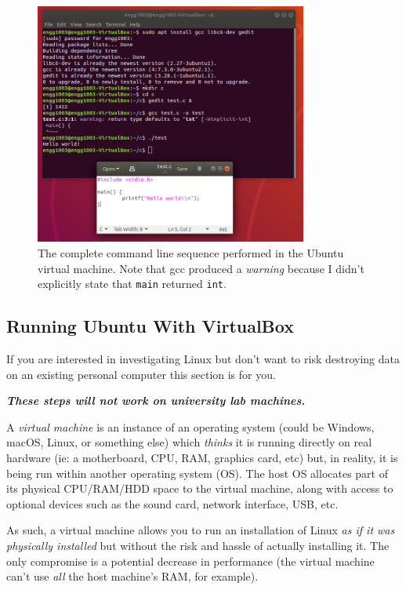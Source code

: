 \documentclass{lab}
\begin{document}
\begin{figure}[H]
\begin{center}
\includegraphics[width=0.8\textwidth]{Wk1Images/c_ubuntu.png}
\end{center}
\caption{The complete command line sequence performed in the Ubuntu virtual machine. Note that gcc produced a \textit{warning} because I didn't explicitly state that \texttt{main} returned \texttt{int}.}\label{fig:c_ubuntu}
\end{figure}

\pagebreak
\subsection{Running Ubuntu With VirtualBox}\label{sec:virtualbox}

If you are interested in investigating Linux but don't want to risk destroying data on an existing personal computer this section is for you.

\textbf{\textit{These steps will not work on university lab machines.}}

A \textit{virtual machine} is an instance of an operating system (could be Windows, macOS, Linux, or something else) which \textit{thinks} it is running directly on real hardware (ie: a motherboard, CPU, RAM, graphics card, etc) but, in reality, it is being run within another operating system (OS). The host OS allocates part of its physical CPU/RAM/HDD space to the virtual machine, along with access to optional devices such as the sound card, network interface, USB, etc.

As such, a virtual machine allows you to run an installation of Linux \textit{as if it was physically installed} but without the risk and hassle of actually installing it. The only compromise is a potential decrease in performance (the virtual machine can't use \textit{all} the host machine's RAM, for example).
\end{document}
